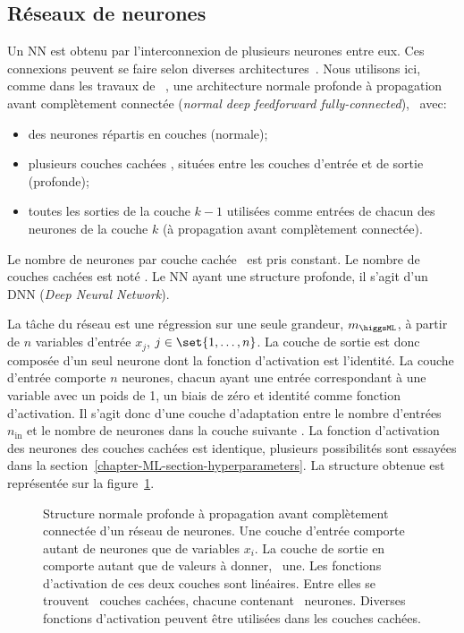 \subsection{Réseaux de neurones}\label{chapter-ML-section-DNN-networks}
Un NN est obtenu par l'interconnexion de plusieurs neurones entre eux.
Ces connexions peuvent se faire selon diverses architectures~\cite{Sarle1994NeuralNA,DNN}.
Nous utilisons ici,
comme dans les travaux de \citeauthor{BARTSCHI201929}~\cite{BARTSCHI201929},
une architecture
normale profonde à propagation avant complètement connectée (\emph{normal deep feedforward fully-connected}),
\ie\ avec:
\begin{itemize}
\item des neurones répartis en couches (normale);
\item plusieurs couches \og cachées \fg, situées entre les couches d'entrée et de sortie (profonde);
\item toutes les sorties de la couche $k-1$ utilisées comme entrées de chacun des neurones de la couche $k$ (à propagation avant complètement connectée).
\end{itemize}
Le nombre de neurones par couche cachée \NNeurons\ est pris constant.
Le nombre de couches cachées est noté \NLayers.
Le NN ayant une structure profonde, il s'agit d'un DNN (\emph{Deep Neural Network}).
\par
La tâche du réseau est une régression sur une seule grandeur, $m_{\higgsML}$, à partir de $n$ variables d'entrée $x_j$, $j\in\set{1,\ldots,n}$.
La couche de sortie est donc composée d'un seul neurone dont la fonction d'activation est l'identité.
La couche d'entrée comporte $n$ neurones, chacun ayant une entrée correspondant à une variable avec un poids de 1, un biais de zéro et identité comme fonction d'activation.
Il s'agit donc d'une couche d'adaptation entre le nombre d'entrées $n_\text{in}$ et le nombre de neurones dans la couche suivante \NNeurons.
La fonction d'activation des neurones des couches cachées est identique, plusieurs possibilités sont essayées dans la section~\ref{chapter-ML-section-hyperparameters}.
La structure obtenue est représentée sur la figure~\ref{fig-neural_network_fr}.
\begin{figure}[h]
\centering

\caption[Structure d'un réseau de neurones.]{Structure normale profonde à propagation avant complètement connectée d'un réseau de neurones. Une couche d'entrée comporte autant de neurones que de variables $x_i$. La couche de sortie en comporte autant que de valeurs à donner, \ie\ une. Les fonctions d'activation de ces deux couches sont linéaires. Entre elles se trouvent \NLayers\ couches cachées, chacune contenant \NNeurons\ neurones. Diverses fonctions d'activation peuvent être utilisées dans les couches cachées.}
\label{fig-neural_network_fr}
\end{figure}
